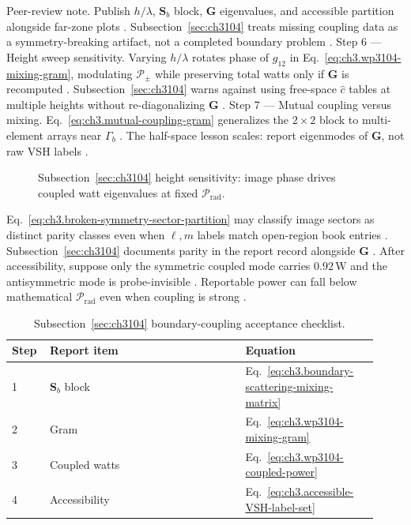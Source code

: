 Peer-review note. Publish \(h/\lambda\), \(\mathbf{S}_{b}\) block, \(\mathbf{G}\) eigenvalues, and accessible partition alongside far-zone plots
\cite{harrington2001}. Subsection~\ref{sec:ch3104} treats missing coupling data as a symmetry-breaking
artifact, not a completed boundary problem \cite{harrington2001}.
Step 6 --- Height sweep sensitivity. Varying \(h/\lambda\) rotates phase of \(g_{12}\) in Eq.~\eqref{eq:ch3.wp3104-mixing-gram}, modulating \(\mathcal{P}_{\pm}\) while preserving
total watts only if \(\mathbf{G}\) is recomputed \cite{jackson1999}. Subsection~\ref{sec:ch3104} warns against
using free-space \(\widehat{c}\) tables at multiple heights without re-diagonalizing \(\mathbf{G}\) \cite{harrington2001}.
Step 7 --- Mutual coupling versus mixing. Eq.~\eqref{eq:ch3.mutual-coupling-gram} generalizes the \(2\times2\) block to multi-element arrays near \(\Gamma_{b}\)
\cite{harrington2001}. The half-space lesson scales: report eigenmodes of \(\mathbf{G}\), not raw VSH labels
\cite{harrington2001}.
\begin{figure}[t]
\centering
{}
\caption{Subsection~\ref{sec:ch3104} height sensitivity: image phase drives coupled watt eigenvalues at fixed $\mathcal{P}_{\mathrm{rad}}$.}
\label{fig:ch3.3104-height-sweep}
\end{figure}
Eq.~\eqref{eq:ch3.broken-symmetry-sector-partition} may classify image sectors as distinct parity classes even when \(\ell,m\) labels match
open-region book entries \cite{harrington2001}. Subsection~\ref{sec:ch3104} documents parity in the report record alongside \(\mathbf{G}\)
\cite{hansen1988}.
After accessibility, suppose only the symmetric coupled mode carries \(0.92\,\mathrm{W}\) and the antisymmetric mode is probe-invisible
\cite{harrington2001}. Reportable power can fall below mathematical \(\mathcal{P}_{\mathrm{rad}}\) even when coupling is strong
\cite{hansen1988}.
\begin{table}[t]
\centering
\caption{Subsection~\ref{sec:ch3104} boundary-coupling acceptance checklist.}
\label{tab:ch3.3104-acceptance}
\small
\begin{tabular}{@{}p{0.08\linewidth}p{0.50\linewidth}p{0.34\linewidth}@{}}
\toprule
Step & Report item & Equation \\
\midrule
1 & $\mathbf{S}_{b}$ block & Eq.~\eqref{eq:ch3.boundary-scattering-mixing-matrix} \\
2 & Gram & Eq.~\eqref{eq:ch3.wp3104-mixing-gram} \\
3 & Coupled watts & Eq.~\eqref{eq:ch3.wp3104-coupled-power} \\
4 & Accessibility & Eq.~\eqref{eq:ch3.accessible-VSH-label-set} \\
\bottomrule
\end{tabular}
\end{table}
